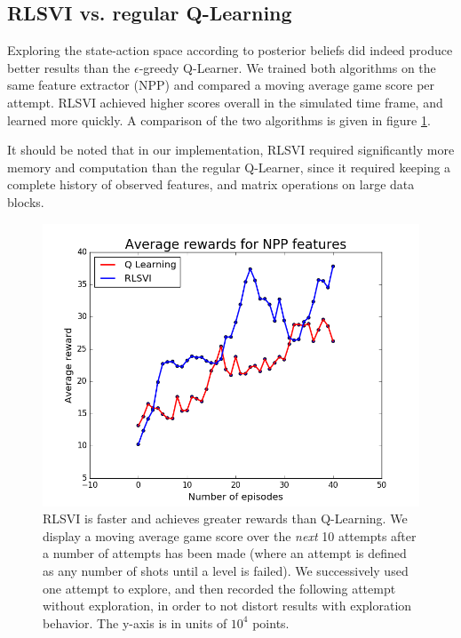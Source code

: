 \documentclass[fleqn,10pt]{SelfArx} %
\begin{document}
\subsection{RLSVI vs. regular Q-Learning}

Exploring the state-action space according to posterior beliefs did indeed produce better results than the $\epsilon$-greedy Q-Learner. We trained both algorithms on the same feature extractor (NPP) and compared a moving average game score per attempt. RLSVI achieved higher scores overall in the simulated time frame, and learned more quickly. A comparison of the two algorithms is given in figure \ref{fig:NPPAverageReward}.

It should be noted that in our implementation, RLSVI required significantly more memory and computation than the regular Q-Learner, since it required keeping a complete history of observed features, and matrix operations on large data blocks.

\begin{figure}[ht]\centering
\includegraphics[width=\linewidth]{NPPAverageReward.png}
\caption{RLSVI is faster and achieves greater rewards than Q-Learning. We display a moving average game score over the \emph{next} 10 attempts after a number of attempts has been made (where an attempt is defined as any number of shots until a level is failed). We successively used one attempt to explore, and then recorded the following attempt without exploration, in order to not distort results with exploration behavior. The y-axis is in units of $10^4$ points.}
\label{fig:NPPAverageReward}
\end{figure}
\end{document}
